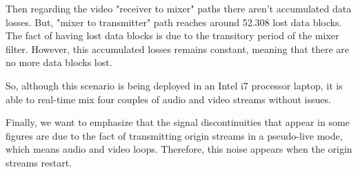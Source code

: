 Then regarding the video "receiver to mixer" paths there aren't accumulated data losses. But, "mixer to transmitter" path reaches around 52.308 lost data blocks. The fact of having lost data blocks is due to the transitory period of the mixer filter. However, this accumulated losses remains constant, meaning that there are no more data blocks lost.

So, although this scenario is being deployed in an Intel i7 processor laptop, it is able to real-time mix four couples of audio and video streams without issues.

Finally, we want to emphasize that the signal discontinuities that appear in some figures are due to the fact of transmitting origin streams in a pseudo-live mode, which means audio and video loops. Therefore, this noise appears when the origin streams restart.